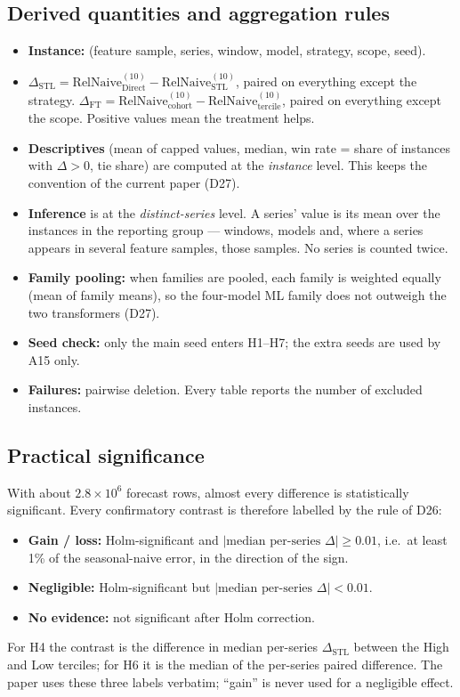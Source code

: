 \documentclass[11pt,a4paper]{article}
\newcommand{\RN}{\mathrm{RelNaive}^{(10)}}
\newcommand{\dstl}{\Delta_{\mathrm{STL}}}
\newcommand{\dft}{\Delta_{\mathrm{FT}}}
\begin{document}
\subsection{Derived quantities and aggregation rules}

\begin{itemize}
  \item \textbf{Instance:} (feature sample, series, window, model, strategy, scope, seed).
  \item $\dstl = \RN_{\text{Direct}} - \RN_{\text{STL}}$, paired on everything except the
  strategy. $\dft = \RN_{\text{cohort}} - \RN_{\text{tercile}}$, paired on everything except the
  scope. Positive values mean the treatment helps.
  \item \textbf{Descriptives} (mean of capped values, median, win rate = share of instances with
  $\Delta > 0$, tie share) are computed at the \emph{instance} level. This keeps the convention of
  the current paper (D27).
  \item \textbf{Inference} is at the \emph{distinct-series} level. A series' value is its mean over
  the instances in the reporting group --- windows, models and, where a series appears in several
  feature samples, those samples. No series is counted twice.
  \item \textbf{Family pooling:} when families are pooled, each family is weighted equally (mean of
  family means), so the four-model ML family does not outweigh the two transformers (D27).
  \item \textbf{Seed check:} only the main seed enters H1--H7; the extra seeds are used by A15 only.
  \item \textbf{Failures:} pairwise deletion. Every table reports the number of excluded instances.
\end{itemize}

\subsection{Practical significance}\label{sec:practical}

With about $2.8 \times 10^6$ forecast rows, almost every difference is statistically significant.
Every confirmatory contrast is therefore labelled by the rule of D26:
\begin{itemize}
  \item \textbf{Gain / loss:} Holm-significant and $|\text{median per-series } \Delta| \geq 0.01$,
  i.e.\ at least 1\% of the seasonal-naive error, in the direction of the sign.
  \item \textbf{Negligible:} Holm-significant but $|\text{median per-series } \Delta| < 0.01$.
  \item \textbf{No evidence:} not significant after Holm correction.
\end{itemize}
For H4 the contrast is the difference in median per-series $\dstl$ between the High and Low
terciles; for H6 it is the median of the per-series paired difference. The paper uses these three
labels verbatim; ``gain'' is never used for a negligible effect.
\end{document}
